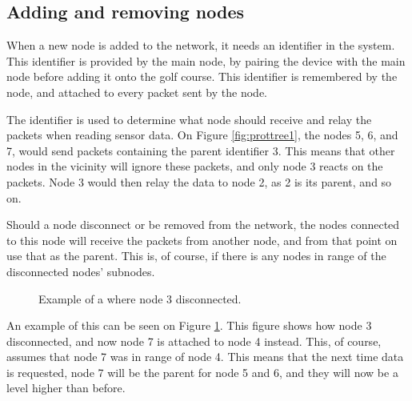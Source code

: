 \subsection*{Adding and removing nodes}
When a new node is added to the network, it needs an identifier in the system. This identifier is provided by the main node, by pairing the device with the main node before adding it onto the golf course. 
This identifier is remembered by the node, and attached to every packet sent by the node.

The identifier is used to determine what node should receive and relay the packets when reading sensor data. On Figure \ref{fig:prottree1}, the nodes 5, 6, and 7, would send packets containing the parent identifier 3. This means that other nodes in the vicinity will ignore these packets, and only node 3 reacts on the packets. Node 3 would then relay the data to node 2, as 2 is its parent, and so on.

Should a node disconnect or be removed from the network, the nodes connected to this node will receive the packets from another node, and from that point on use that as the parent. This is, of course, if there is any nodes in range of the disconnected nodes' subnodes. 

\begin{figure}[!h]
	\centering
	\caption{Example of a where node 3 disconnected.}
	\label{fig:prottree2}
\end{figure}

An example of this can be seen on Figure \ref{fig:prottree2}. This figure shows how node 3 disconnected, and now node 7 is attached to node 4 instead. This, of course, assumes that node 7 was in range of node 4.
This means that the next time data is requested, node 7 will be the parent for node 5 and 6, and they will now be a level higher than before.

